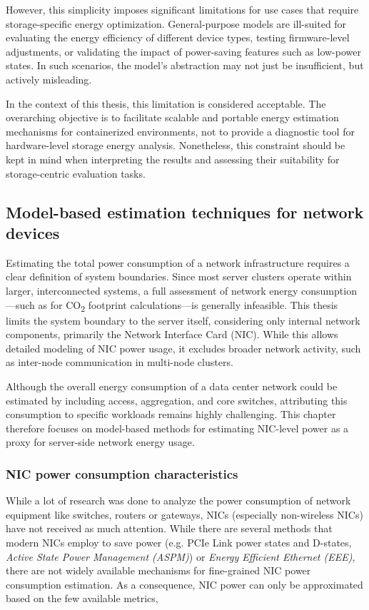 However, this simplicity imposes significant limitations for use cases that require storage-specific energy optimization. General-purpose models are ill-suited for evaluating the energy efficiency of different device types, testing firmware-level adjustments, or validating the impact of power-saving features such as low-power states. In such scenarios, the model’s abstraction may not just be insufficient, but actively misleading.

In the context of this thesis, this limitation is considered acceptable. The overarching objective is to facilitate scalable and portable energy estimation mechanisms for containerized environments, not to provide a diagnostic tool for hardware-level storage energy analysis. Nonetheless, this constraint should be kept in mind when interpreting the results and assessing their suitability for storage-centric evaluation tasks.

\subsection{Model-based estimation techniques for network devices}

Estimating the total power consumption of a network infrastructure requires a clear definition of system boundaries. Since most server clusters operate within larger, interconnected systems, a full assessment of network energy consumption—such as for CO\textsubscript{2} footprint calculations—is generally infeasible. This thesis limits the system boundary to the server itself, considering only internal network components, primarily the Network Interface Card (NIC). While this allows detailed modeling of NIC power usage, it excludes broader network activity, such as inter-node communication in multi-node clusters.

Although the overall energy consumption of a data center network could be estimated by including access, aggregation, and core switches, attributing this consumption to specific workloads remains highly challenging. This chapter therefore focuses on model-based methods for estimating NIC-level power as a proxy for server-side network energy usage.

\subsubsection{NIC power consumption characteristics}
While a lot of research was done to analyze the power consumption of network equipment like switches, routers or gateways, NICs (especially non-wireless NICs) have not received as much attention. While there are several methods that modern NICs employ to save power (e.g. PCIe Link power states and D-states, \textit{Active State Power Management (ASPM)}) or \textit{Energy Efficient Ethernet (EEE)}, there are not widely available mechanisms for fine-grained NIC power consumption estimation. As a consequence, NIC power can only be approximated based on the few available metrics, 

